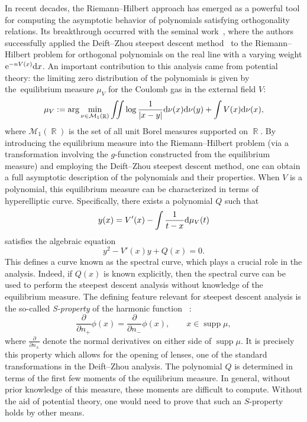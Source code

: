 \documentclass[10pt,a4paper]{amsart}
\DeclareMathOperator{\RR}{\mathbb{R}}
\numberwithin{equation}{section}
\begin{document}
In recent decades, the Riemann--Hilbert approach has emerged as a powerful tool for computing the asymptotic behavior of polynomials satisfying orthogonality relations. Its breakthrough occurred with the seminal work~\cite{DKMVZ}, where the authors successfully applied the Deift--Zhou steepest descent method~\cite{Deift-Zhou} to the Riemann--Hilbert problem for orthogonal polynomials on the real line with a varying weight ${\rm e}^{-nV(x)}{\rm d}x$. An important contribution to this analysis came from potential theory: the limiting zero distribution of the polynomials is given by the~equilibrium measure $\mu_V$ for the Coulomb gas in the external field $V$:
 \begin{equation*}
 \mu_{V} := \arg \min_{\nu\in \mathcal{M}_1(\RR)} \iint \log \frac{1}{|x-y|} {\rm d}\nu(x){\rm d}\nu(y) + \int V(x) {\rm d}\nu(x),
 \end{equation*}
where $\mathcal{M}_1(\RR)$ is the set of all unit Borel measures supported on $\RR$.
By introducing the equilibrium measure into the Riemann--Hilbert problem (via a transformation involving the $g$-function constructed from the equilibrium measure) and employing the Deift--Zhou steepest descent method, one can obtain a full asymptotic description of the polynomials and their properties. When $V$ is a polynomial, this equilibrium measure can be characterized in terms of hyperelliptic curve. Specifically, there exists a polynomial $Q$ such that
\begin{equation} \label{eq:1myx}
 y(x)=V'(x)- \int \frac{1}{t-x}{\rm d}\mu_V(t)
\end{equation}
satisfies the algebraic equation
\begin{equation*}
 y^2-V'(x)y+Q(x)=0.
\end{equation*}
This defines a curve known as the spectral curve, which plays a crucial role in the analysis. Indeed, if $Q(x)$ is known explicitly, then the spectral curve can be used to perform the steepest descent analysis without knowledge of the equilibrium measure. The defining feature relevant for steepest descent analysis is the so-called \textit{S-property} of the harmonic function ~\cite{KS}:
 \begin{equation*}
 \frac{\partial}{\partial n_+} \phi(x) = \frac{\partial}{\partial n_-} \phi(x), \qquad x\in \operatorname{supp}\mu,
 \end{equation*}
where $\frac{\partial}{\partial n_{\pm}}$ denote the normal derivatives on either side of $\operatorname{supp}\mu$.
 It is precisely this property which allows for the opening of lenses, one of the standard transformations in the Deift--Zhou analysis. The polynomial $Q$ is determined in terms of the first few moments of the equilibrium measure. In general, without prior knowledge of this measure, these moments are difficult to compute. Without the aid of potential theory, one would need to prove that such an $S$-property holds by other means.
\end{document}
